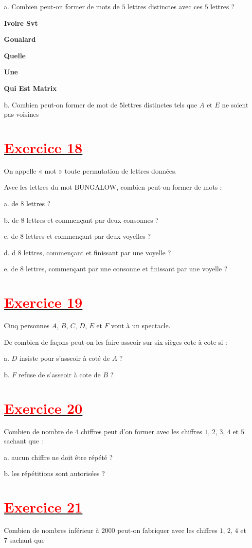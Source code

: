 \documentclass[12pt]{article}
\begin{document}
a. Combien peut-on former de mots de $5$ lettres distinctes avec ces $5$ lettres ?

\textbf{Ivoire Svt} 

\textbf{Goualard} 

\textbf{Quelle} 

\textbf{Une} 

\textbf{Qui Est Matrix} 

b. Combien peut-on former de mot de $5$lettres distinctes tels que $A$ et $E$ ne soient pas voisines 

\section*{\underline{\textbf{\textcolor{red}{Exercice 18}}}}
On appelle « mot » toute permutation de lettres données.

Avec les lettres du mot BUNGALOW, combien peut-on former de mots :

a. de $8$ lettres ?

b. de $8$ lettres et commençant par deux consonnes ?

c. de $8$ lettres et commençant par deux voyelles ?

d. d $8$ lettres, commençant et finissant par une voyelle ?


e. de $8$ lettres, commençant par une consonne et finissant par une voyelle ?
\section*{\underline{\textbf{\textcolor{red}{Exercice 19}}}}
Cinq personnes $A$, $B$, $C$, $D$, $E$ et $F$ vont à un spectacle.

De combien de façons peut-on les faire asseoir sur six sièges cote à cote si :

a. $D$ insiste pour s'asseoir à coté de $A$ ?

b. $F$ refuse de s'asseoir  à cote de $B$ ?
\section*{\underline{\textbf{\textcolor{red}{Exercice 20}}}}
Combien de nombre de $4$ chiffres peut d'on former avec les chiffres $1$, $2$, $3$, $4$ et $5$ sachant que :

a. aucun chiffre ne doit être répété ?

b. les répétitions sont autorisées ?
\section*{\underline{\textbf{\textcolor{red}{Exercice 21}}}}
Combien de nombres inférieur à $2000$ peut-on fabriquer avec les chiffres $1$, $2$, $4$ et $7$ sachant que
\end{document}
